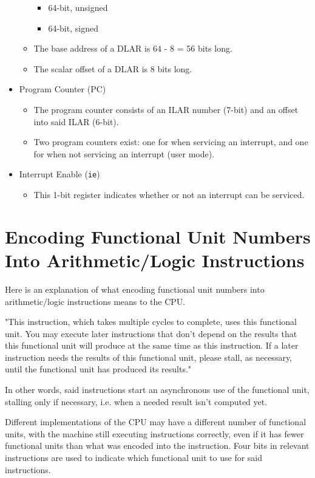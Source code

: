\documentclass{article}
\begin{document}
\begin{itemize}
\begin{itemize}
\begin{itemize}
			\item 64-bit, unsigned
			\item 64-bit, signed
			\end{itemize}
		\item The base address of a DLAR is 64 - 8 = 56 bits long.
		\item The scalar offset of a DLAR is 8 bits long.
		\end{itemize}
	\item Program Counter (PC)
		\begin{itemize}
		\item The program counter consists of an ILAR number (7-bit) and an
			offset into said ILAR (6-bit).
		\item Two program counters exist:  one for when servicing an
			interrupt, and one for when not servicing an interrupt (user
			mode).
		\end{itemize}
	\item Interrupt Enable (\texttt{ie})
		\begin{itemize}
		\item This 1-bit register indicates whether or not an interrupt can
			be serviced.
		\end{itemize}
	\end{itemize}

\newpage
\section{Encoding Functional Unit Numbers Into Arithmetic/Logic
	Instructions}

	Here is an explanation of what encoding functional unit numbers into
	arithmetic/logic instructions means to the CPU.

	"This instruction, which takes multiple cycles to complete, uses this
	functional unit.  You may execute later instructions that don't depend
	on the results that this functional unit will produce at the same time
	as this instruction.  If a later instruction needs the results of this
	functional unit, please stall, as necessary, until the functional unit
	has produced its results."

	In other words, said instructions start an asynchronous use of the
	functional unit, stalling only if necessary, i.e. when a needed result
	isn't computed yet.

	Different implementations of the CPU may have a different number of
	functional units, with the machine still executing instructions
	correctly, even if it has fewer functional units than what was encoded
	into the instruction.  Four bits in relevant instructions are used to
	indicate which functional unit to use for said instructions.
\end{document}
